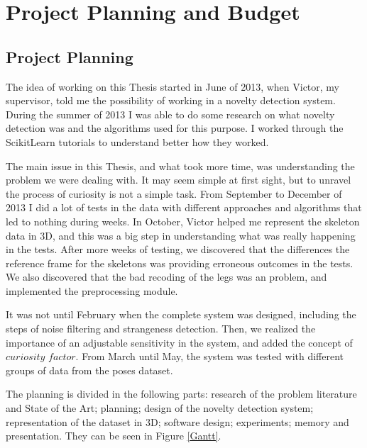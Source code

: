 
\chapter{Project Planning and Budget} %

\label{AppendixC} %



\section{Project Planning}

The idea of working on this Thesis started in June of 2013, when Victor, my supervisor, told me the possibility of working in a novelty detection system. During the summer of 2013 I was able to do some research on what novelty detection was and the algorithms used for this purpose. I worked through the ScikitLearn \cite{scikit-learn} tutorials to understand better how they worked.

The main issue in this Thesis, and what took more time, was understanding the problem we were dealing with. It may seem simple at first sight, but to unravel the process of curiosity is not a simple task. From September to December of 2013 I did a lot of tests in the data with different approaches and algorithms that led to nothing during weeks. In October, Victor helped me represent the skeleton data in 3D, and this was a big step in understanding what was really happening in the tests. After more weeks of testing, we discovered that the differences the reference frame for the skeletons was providing erroneous outcomes in the tests. We also discovered that the bad recoding of the legs was an problem, and implemented the preprocessing module.

It was not until February when the complete system was designed, including the steps of noise filtering and strangeness detection. Then, we realized the importance of an adjustable sensitivity in the system, and added the concept of $curiosity$ $factor$. From March until May, the system was tested with different groups of data from the poses dataset.

The planning is divided in the following parts: research of the problem literature and State of the Art; planning; design of the novelty detection system; representation of the dataset in 3D; software design; experiments; memory and presentation. They can be seen in Figure \ref{Gantt}.

